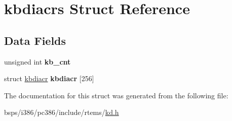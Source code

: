 \hypertarget{structkbdiacrs}{}\section{kbdiacrs Struct Reference}
\label{structkbdiacrs}
\subsection*{Data Fields}
\begin{DoxyCompactItemize}
\item 
\mbox{\label{structkbdiacrs_a455a9cd9b98679aaf8551aa4b45f0c7c}} 
unsigned int {\bfseries kb\+\_\+cnt}
\item 
\mbox{\label{structkbdiacrs_aefc60ba48f267cc3cb579084633853b3}} 
struct \mbox{\hyperlink{structkbdiacr}{kbdiacr}} {\bfseries kbdiacr} \mbox{[}256\mbox{]}
\end{DoxyCompactItemize}


The documentation for this struct was generated from the following file\+:\begin{DoxyCompactItemize}
\item 
bsps/i386/pc386/include/rtems/\mbox{\hyperlink{kd_8h}{kd.\+h}}\end{DoxyCompactItemize}
